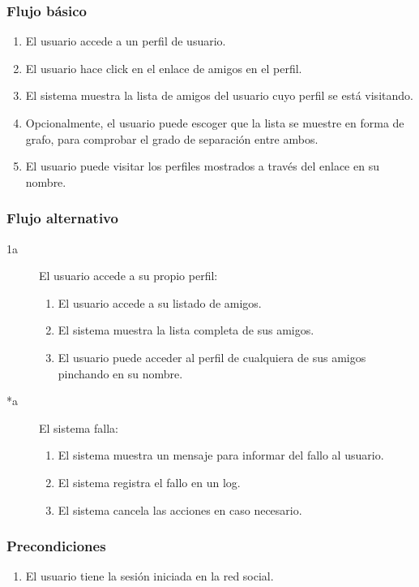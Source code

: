 \documentclass[12pt, a4paper, titlepage]{article}
\begin{document}
\subsubsection{Flujo básico}
\begin{enumerate}
	\item El usuario accede a un perfil de usuario.
	\item El usuario hace click en el enlace de amigos en el perfil.
	\item El sistema muestra la lista de amigos del usuario cuyo perfil se está visitando.
	\item Opcionalmente, el usuario puede escoger que la lista se muestre en forma de grafo, para comprobar el grado de separación entre ambos.
	\item El usuario puede visitar los perfiles mostrados a través del enlace en su nombre.
\end{enumerate}

\subsubsection{Flujo alternativo}

\begin{description}
	\item [1a] El usuario accede a su propio perfil:
	\begin{enumerate}
		\item El usuario accede a su listado de amigos.
		\item El sistema muestra la lista completa de sus amigos.
		\item El usuario puede acceder al perfil de cualquiera de sus amigos pinchando en su nombre.
	\end{enumerate}
\end{description}

\begin{description}
	\item [*a] El sistema falla:
	\begin{enumerate}
		\item El sistema muestra un mensaje para informar del fallo al usuario.
		\item El sistema registra el fallo en un log.
		\item El sistema cancela las acciones en caso necesario.
	\end{enumerate}
\end{description}

\subsubsection{Precondiciones}
\begin{enumerate}
	\item El usuario tiene la sesión iniciada en la red social.
\end{enumerate}
\end{document}
